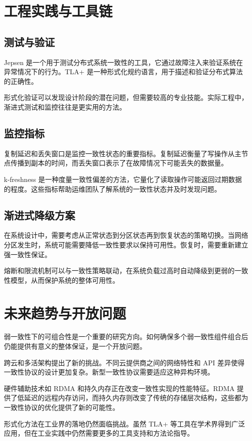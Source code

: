 \chapter{工程实践与工具链}
\section{测试与验证}
Jepsen 是一个用于测试分布式系统一致性的工具，它通过故障注入来验证系统在异常情况下的行为。TLA+ 是一种形式化规约语言，用于描述和验证分布式算法的正确性。\par
形式化验证可以发现设计阶段的潜在问题，但需要较高的专业技能。实际工程中，渐进式测试和监控往往是更实用的方法。\par
\section{监控指标}
复制延迟和丢失窗口是监控一致性状态的重要指标。复制延迟衡量了写操作从主节点传播到副本的时间，而丢失窗口表示了在故障情况下可能丢失的数据量。\par
k-freshness 是一种度量一致性偏差的方法，它量化了读取操作可能返回过期数据的程度。这些指标帮助运维团队了解系统的一致性状态并及时发现问题。\par
\section{渐进式降级方案}
在系统设计中，需要考虑从正常状态到分区状态再到恢复状态的策略切换。当网络分区发生时，系统可能需要降低一致性要求以保持可用性。恢复时，需要重新建立强一致性保证。\par
熔断和限流机制可以与一致性策略联动，在系统负载过高时自动降级到更弱的一致性模型，从而保护系统的整体可用性。\par
\chapter{未来趋势与开放问题}
弱一致性下的可组合性是一个重要的研究方向。如何确保多个弱一致性组件组合后仍能提供有意义的整体保证，是一个开放问题。\par
跨云和多活架构提出了新的挑战。不同云提供商之间的网络特性和 API 差异使得一致性协议的设计更加复杂。新型一致性协议需要适应这种异构环境。\par
硬件辅助技术如 RDMA 和持久内存正在改变一致性实现的性能特征。RDMA 提供了低延迟的远程内存访问，而持久内存则改变了传统的存储层次结构，这些都为一致性协议的优化提供了新的可能性。\par
形式化方法在工业界的落地仍然面临挑战。虽然 TLA+ 等工具在学术界得到广泛应用，但在工业实践中仍然需要更多的工具支持和方法论指导。\par
